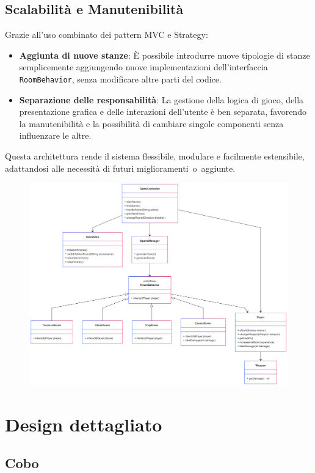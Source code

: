 \documentclass[a4paper,12pt]{report}
\begin{document}
\subsection*{Scalabilità e Manutenibilità}
Grazie all'uso combinato dei pattern MVC e Strategy:
\begin{itemize}
    \item \textbf{Aggiunta di nuove stanze}: È possibile introdurre nuove tipologie di stanze semplicemente aggiungendo nuove implementazioni dell'interfaccia \texttt{RoomBehavior}, senza modificare altre parti del codice.
    \item \textbf{Separazione delle responsabilità}: La gestione della logica di gioco, della presentazione grafica e delle interazioni dell'utente è ben separata, favorendo la manutenibilità e la possibilità di cambiare singole componenti senza influenzare le altre.
\end{itemize}

Questa architettura rende il sistema flessibile, modulare e facilmente estensibile, adattandosi alle necessità di futuri miglioramenti o aggiunte.
%
\begin{figure}[H]
	\includegraphics[scale=0.12]{img/design.png}
\end{figure}

\section{Design dettagliato}
\subsection{Cobo}
\end{document}
